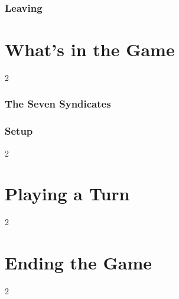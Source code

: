 \documentclass[12pt,letterpaper]{article}
\begin{document}
\subsection{Leaving}
\begin{keytable}
\end{keytable}

\renewcommand{\secstatus}{THE \MakeUppercase{\V{grid}} \quad // \quad THE SYNDICATES \quad // \quad SETUP}
\chapter{What's in the Game}
\begin{multicols}{2}
\end{multicols}

\subsection{The Seven Syndicates}
\syntable

\subsection{Setup}
\begin{multicols}{2}
\end{multicols}

\renewcommand{\secstatus}{\MakeUppercase{\V{spike}} \quad // \quad BUY \quad // \quad DRAW}
\chapter{Playing a Turn}
\begin{multicols}{2}
\end{multicols}

\renewcommand{\secstatus}{\MakeUppercase{\V{totalcompromise}} \quad // \quad \MakeUppercase{\V{lockdown}} \quad // \quad \MakeUppercase{\V{cashout}}}
\chapter{Ending the Game}
\begin{multicols}{2}
\end{multicols}
\end{document}
